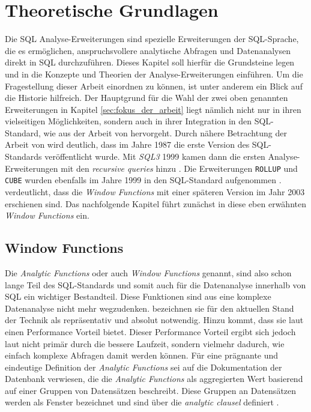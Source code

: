 \chapter{Theoretische Grundlagen}
\label{chap:hintergund_und_grundlagen} Die SQL Analyse-Erweiterungen sind spezielle
Erweiterungen der SQL-Sprache, die es ermöglichen, anspruchsvollere analytische Abfragen
und Datenanalysen direkt in SQL durchzuführen. Dieses Kapitel soll hierfür die
Grundsteine legen und in die Konzepte und Theorien der Analyse-Erweiterungen
einführen. Um die Fragestellung dieser Arbeit einordnen zu können, ist unter
anderem ein Blick auf die Historie hilfreich. Der Hauptgrund für die Wahl der zwei
oben genannten Erweiterungen in Kapitel \ref{sec:fokus_der_arbeit} liegt nämlich
nicht nur in ihren vielseitigen Möglichkeiten, sondern auch in ihrer Integration
in den SQL-Standard, wie aus der Arbeit von \citet[S.~10]{grust2017advanced}
hervorgeht. Durch nähere Betrachtung der Arbeit von \citet[S.~10]{grust2017advanced}
wird deutlich, dass im Jahre 1987 die erste Version des SQL-Standards veröffentlicht
wurde. Mit \textit{SQL3} 1999 kamen dann die ersten Analyse-Erweiterungen mit den
\textit{recursive queries} hinzu \citep[vgl.][S.~10]{grust2017advanced}. Die
Erweiterungen \texttt{ROLLUP} und \texttt{CUBE} wurden ebenfalls im Jahre 1999
in den SQL-Standard aufgenommen \citep[vgl.][Kapitel 9.12]{melton2001sql}. \citet[S.~10]{grust2017advanced}
verdeutlicht, dass die \textit{Window Functions} mit einer späteren Version im
Jahr 2003 erschienen sind. Das nachfolgende Kapitel führt zunächst in diese eben
erwähnten \textit{Window Functions} ein.

\section{Window Functions}
\label{sec:window_functions} Die \textit{Analytic Functions} oder auch \textit{Window
Functions} genannt, sind also schon lange Teil des SQL-Standards und somit auch für
die Datenanalyse innerhalb von SQL ein wichtiger Bestandteil. Diese Funktionen
sind aus eine komplexe Datenanalyse nicht mehr wegzudenken. \citet[S. 1244]{cao2012optimization}
bezeichnen sie für den aktuellen Stand der Technik als repräsentativ und absolut
notwendig. Hinzu kommt, dass sie laut \citet[S. 113]{kellenberger2019expert} einen
Performance Vorteil bietet. Dieser Performance Vorteil ergibt sich jedoch laut
\citet[S.~113]{kellenberger2019expert} nicht primär durch die bessere Laufzeit,
sondern vielmehr dadurch, wie einfach komplexe Abfragen damit werden können. Für
eine prägnante und eindeutige Definition der \textit{Analytic Functions} sei auf
die Dokumentation der \citet[K.~7]{oracle} Datenbank verwiesen, die die \textit{Analytic
Functions} als aggregierten Wert basierend auf einer Gruppen von Datensätzen
beschreibt. Diese Gruppen an Datensätzen werden als Fenster bezeichnet und sind über
die \textit{analytic clausel} definiert \citep[vgl.][K. 7]{oracle}.


